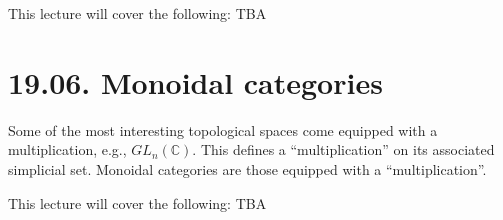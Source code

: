 \documentclass[a4paper]{amsart}
\numberwithin{figure}{section}
\theoremstyle{theorem}
\theoremstyle{definition}
\newcommand{\CC}{\mathbb{C}}
\begin{document}
This lecture will cover the following: TBA





\section{19.06. Monoidal categories} 

Some of the most interesting topological spaces come equipped with a multiplication, e.g., $GL_n(\CC)$. This defines a ``multiplication'' on its associated simplicial set. Monoidal categories are those equipped with a ``multiplication''. %

This lecture will cover the following: TBA

\end{document}
